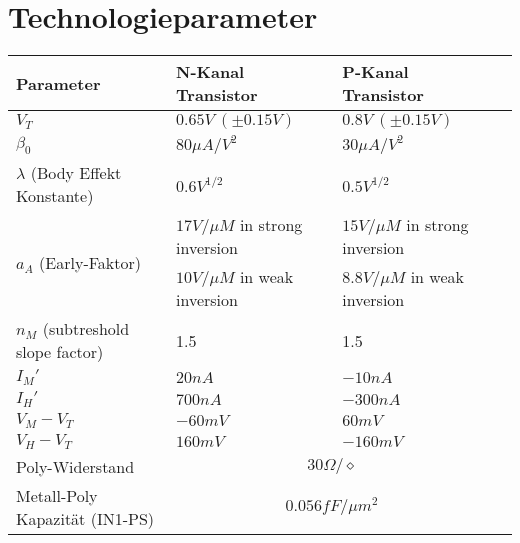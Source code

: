 \appendix

\section{Technologieparameter}

\begin{tabularx}{\linewidth}{|X|l|ll|}
	\hline
		\textbf{Parameter} & \textbf{N-Kanal Transistor} & \textbf{P-Kanal Transistor} &
	\\ \hline
		$V_T$ & $0.65V \: (\pm 0.15V)$ & $0.8V \: (\pm 0.15V)$ &
	\\ \hline
		$\beta_0$ & $80 \mu A / V^2$ & $30 \mu A / V^2$ &
	\\ \hline
		$\lambda$ (Body Effekt Konstante) & $0.6V^{1/2}$ & $0.5 V^{1/2}$ & 
	\\ \hline
		\multirow{2}{*}{$a_A$ (Early-Faktor)} & $17V/\mu M$ in strong inversion & $15V/\mu M$ in strong inversion &
	\\
		& $10V/\mu M$ in weak inversion & $8.8V/\mu M$ in weak inversion &
	\\ \hline
		$n_M$ (subtreshold slope factor) & 1.5 & 1.5 &
	\\ \hline
		$I_M'$ & $20nA$ & $-10nA$ &
	\\ \hline
		$I_H'$ & $700nA$ & $-300nA$ &
	\\ \hline
		$V_M-V_T$ & $-60mV$ & $60mV$ &
	\\ \hline
		$V_H-V_T$ & $160mV$ & $-160mV$ &
	\\ \hline
		Poly-Widerstand & \multicolumn{2}{c}{$30 \Omega / \diamond$} &
	\\ \hline
		Metall-Poly Kapazität (IN1-PS) & \multicolumn{2}{c}{$0.056 fF / \mu m^2$} &
	\\ \hline
\end{tabularx}